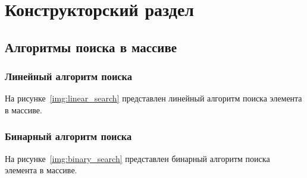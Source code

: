 \chapter{Конструкторский раздел}
\section{Алгоритмы поиска в массиве}
\label{section:shemas_algo}

\subsection{Линейный алгоритм поиска}
На рисунке~\ref{img:linear_search} представлен линейный алгоритм поиска элемента в массиве. 

\newpage
\subsection{Бинарный алгоритм поиска}
На рисунке~\ref{img:binary_search} представлен бинарный алгоритм поиска элемента в массиве. 
